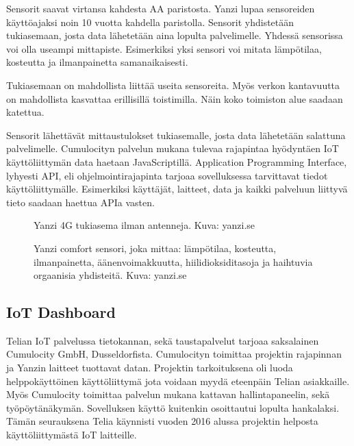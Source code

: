 \documentclass{tktltiki}
\begin{document}
Sensorit saavat virtansa kahdesta AA paristosta. Yanzi lupaa sensoreiden käyttöajaksi noin 10 vuotta kahdella paristolla. Sensorit yhdistetään tukiasemaan, josta data lähetetään aina lopulta palvelimelle. Yhdessä sensorissa voi olla useampi mittapiste. Esimerkiksi yksi sensori voi mitata lämpötilaa, kosteutta ja ilmanpainetta samanaikaisesti. 

Tukiasemaan on mahdollista liittää useita sensoreita. Myös verkon kantavuutta on mahdollista kasvattaa erillisillä toistimilla. Näin koko toimiston alue saadaan katettua. 

Sensorit lähettävät mittaustulokset tukiasemalle, josta data lähetetään salattuna palvelimelle. Cumulocityn palvelun mukana tulevaa rajapintaa hyödyntäen IoT käyttöliittymän data haetaan JavaScriptillä. Application Programming Interface, lyhyesti API, eli ohjelmointirajapinta tarjoaa sovelluksessa tarvittavat tiedot käyttöliittymälle. Esimerkiksi käyttäjät, laitteet, data ja kaikki palveluun liittyvä tieto saadaan haettua APIa vasten. 

\begin{figure}[h]
\begin{center}
\caption{Yanzi 4G tukiasema ilman antenneja. Kuva: yanzi.se}
\label{Yanzi tukiasema}
\end{center}
\end{figure}

\begin{figure}[h]
\begin{center}
\caption{Yanzi comfort sensori, joka mittaa: lämpötilaa, kosteutta, ilmanpainetta, äänenvoimakkuutta, hiilidioksiditasoja ja haihtuvia orgaanisia yhdisteitä. Kuva: yanzi.se}
\label{Yanzi sensori}
\end{center}
\end{figure}
\clearpage

\subsection{IoT Dashboard}

Telian IoT palvelussa tietokannan, sekä taustapalvelut tarjoaa saksalainen Cumulocity GmbH, Dusseldorfista. Cumulocityn toimittaa projektin rajapinnan ja Yanzin laitteet tuottavat datan. Projektin tarkoituksena oli luoda helppokäyttöinen käyttöliittymä jota voidaan myydä eteenpäin Telian asiakkaille. Myös Cumulocity toimittaa palvelun mukana kattavan hallintapaneelin, sekä työpöytänäkymän. Sovelluksen käyttö kuitenkin osoittautui lopulta hankalaksi. Tämän seurauksena Telia käynnisti vuoden 2016 alussa projektin helposta käyttöliittymästä IoT laitteille. 
\end{document}
